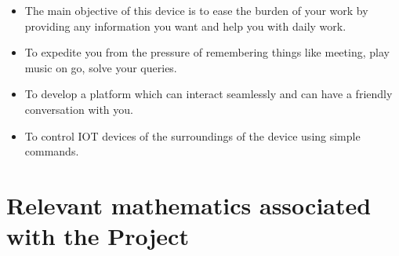 \documentclass[16pt,oneside,a4paper]{article}
\begin{document}
\begin{itemize}
	\item The main objective of this device is to ease the burden of your work by providing any information you want and help you with daily work.
	\item To expedite you from the pressure of remembering things like meeting, play music on go, solve your queries.
	\item To develop a platform which can interact seamlessly and can have a friendly conversation with you.
	\item To control IOT devices of the surroundings of the device using simple commands.
\end{itemize}

	
\section{Relevant mathematics associated with the Project}
\label{sec:math}
\end{document}
